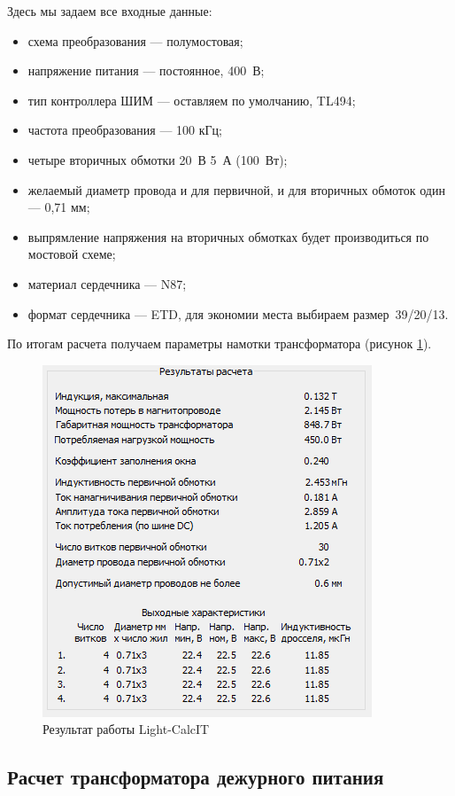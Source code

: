\documentclass[utf8x, 14pt, oneside, a4paper]{article}
\begin{document}
		Здесь мы задаем все входные данные:
		
		\begin{itemize}
			\item схема преобразования --- полумостовая;
			\item напряжение питания --- постоянное, 400~В;
			\item тип контроллера ШИМ --- оставляем по умолчанию, TL494;
			\item частота преобразования --- 100 кГц;
			\item четыре вторичных обмотки 20~В 5~А (100~Вт);
			\item желаемый диаметр провода и для первичной, и для вторичных обмоток один --- 0,71 мм;
			\item выпрямление напряжения на вторичных обмотках будет производиться по мостовой схеме;
			\item материал сердечника --- N87;
			\item формат сердечника --- ETD, для экономии места выбираем размер~39/20/13.
		\end{itemize}
	
		По итогам расчета получаем параметры намотки трансформатора (рисунок \ref{fig:calcIT_result}).
		
		\begin{figure}[H]
			\centering
			\includegraphics[width=0.7\linewidth]{"Рисунки/LightCalcIT_result"}
			\caption{Результат работы Light-CalcIT}
			\label{fig:calcIT_result}
		\end{figure}
		
		\subsection{Расчет трансформатора дежурного питания}
		
\end{document}
